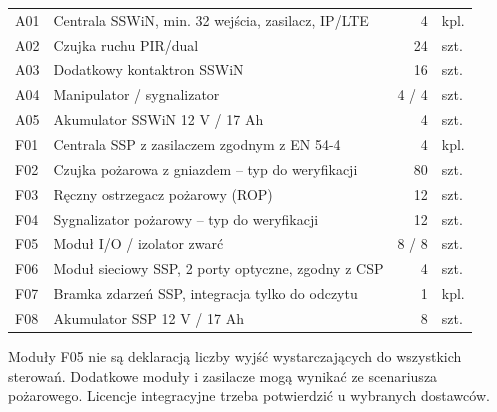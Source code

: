 \begin{tabularx}{\linewidth}{@{}P{11mm}Y r P{15mm}@{}}
A01 & Centrala SSWiN, min. 32 wejścia, zasilacz, IP/LTE & 4 & kpl.\\
A02 & Czujka ruchu PIR/dual & 24 & szt.\\
A03 & Dodatkowy kontaktron SSWiN & 16 & szt.\\
A04 & Manipulator / sygnalizator & 4 / 4 & szt.\\
A05 & Akumulator SSWiN 12 V / 17 Ah & 4 & szt.\\\midrule
F01 & Centrala SSP z zasilaczem zgodnym z EN 54-4 & 4 & kpl.\\
F02 & Czujka pożarowa z gniazdem -- typ do weryfikacji & 80 & szt.\\
F03 & Ręczny ostrzegacz pożarowy (ROP) & 12 & szt.\\
F04 & Sygnalizator pożarowy -- typ do weryfikacji & 12 & szt.\\
F05 & Moduł I/O / izolator zwarć & 8 / 8 & szt.\\
F06 & Moduł sieciowy SSP, 2 porty optyczne, zgodny z CSP & 4 & szt.\\
F07 & Bramka zdarzeń SSP, integracja tylko do odczytu & 1 & kpl.\\
F08 & Akumulator SSP 12 V / 17 Ah & 8 & szt.\\\bottomrule
\end{tabularx}
\endgroup
\vfill
{\footnotesize\color{muted}Moduły F05 nie są deklaracją liczby wyjść wystarczających do wszystkich sterowań. Dodatkowe moduły i zasilacze mogą wynikać ze scenariusza pożarowego. Licencje integracyjne trzeba potwierdzić u wybranych dostawców.}
